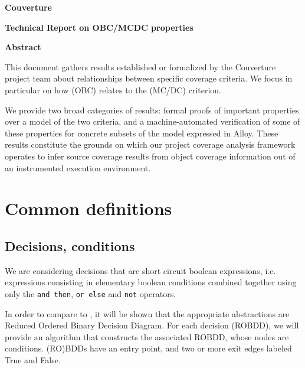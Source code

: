 \documentclass[a4paper,12pt,twoside]{article}
\newcommand{\couv}{{\sc Couverture}}
\newcommand{\andthen}{\texttt{and then}}
\newcommand{\orelse}{\texttt{or else}}
\newcommand{\adanot}{\texttt{not}}
\begin{document}
\pagestyle{empty}

\vfill

\begin{center}%
{\Large \textbf{\couv{}}}

{\Large \textbf{Technical Report on OBC/MCDC properties}}

\vfill

{\large \textbf{Abstract}}
\end{center}

This document gathers results established or formalized by the \couv{}
project team about relationships between specific coverage criteria.
%
We focus in particular on how  (OBC) relates to the
 (MC/DC) criterion.

We provide two broad categories of results: formal proofs of important
properties over a model of the two criteria, and a machine-automated
verification of some of these properties for concrete subsets of the model
expressed in Alloy.
%
These results constitute the grounds on which our project coverage analysis
framework operates to infer source coverage results from object coverage
information out of an instrumented execution environment.

\vfill

\newpage
\pagestyle{plain}


\section{Common definitions}

\subsection{Decisions, conditions}

We are considering decisions that are short circuit boolean expressions,
i.e. expressions consisting in elementary boolean conditions combined
together using only the \andthen{}, \orelse{} and \adanot{} operators.

In order to compare  to , it will be shown that the appropriate
abstractions are Reduced Ordered Binary Decision Diagram. For each
decision (ROBDD), we will provide an algorithm that constructs the
associated ROBDD, whose nodes are conditions. (RO)BDDs have an entry
point, and two or more exit edges labeled True and False.
\end{document}
